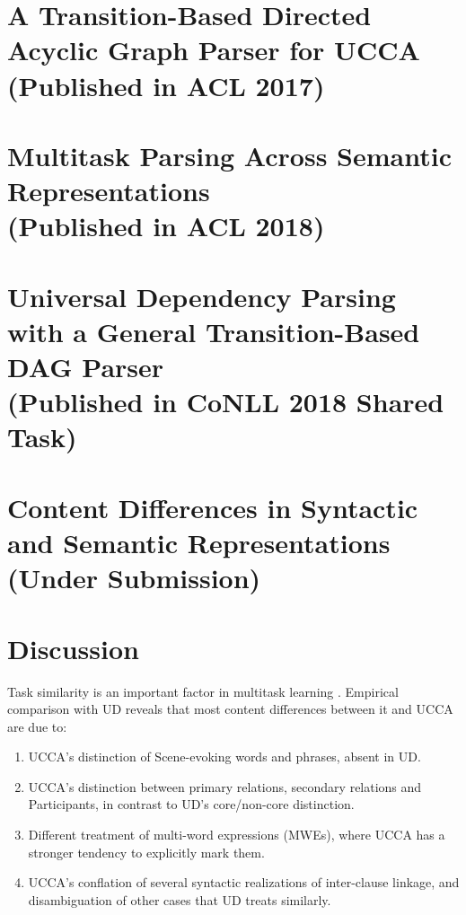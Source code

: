 \documentclass[12pt,a4paper]{report}
\begin{document}
\chapter{A Transition-Based Directed Acyclic Graph Parser for UCCA \\ (Published in ACL 2017)}



\chapter{Multitask Parsing Across Semantic Representations \\ (Published in ACL 2018)}



\chapter{Universal Dependency Parsing with a General Transition-Based DAG Parser \\ (Published in CoNLL 2018 Shared Task)}



\chapter{Content Differences in Syntactic and Semantic Representations \\ (Under Submission)}



\chapter{Discussion}

Task similarity is an important factor in multitask learning
\citep{E17-2026,E17-1005}.
Empirical comparison with UD reveals that most content differences between it and UCCA are due to:
  \begin{enumerate}
      \item UCCA's distinction of Scene-evoking words and phrases, absent in UD.
      \item UCCA's distinction between primary relations, secondary relations
        and Participants, in contrast to UD's core/non-core distinction.
      \item Different treatment of multi-word expressions (MWEs),
        where UCCA has a stronger tendency to explicitly mark them.
      \item UCCA's conflation of several syntactic realizations of inter-clause linkage,
        and disambiguation of other cases that UD treats similarly.
   \end{enumerate}
\end{document}
